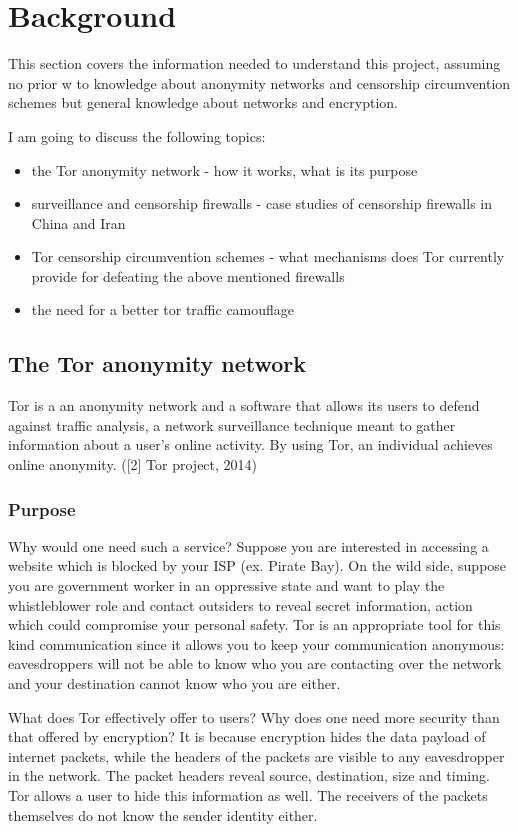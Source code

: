 \documentclass[11pt]{article} %
\begin{document}
\section{Background}

This section covers the information needed to understand this project, assuming no prior w to knowledge about anonymity networks and censorship circumvention schemes but general knowledge about networks and encryption.

I am going to discuss the following topics:

\begin{itemize}
\item the Tor anonymity network - how it works, what is its purpose
\item surveillance and censorship firewalls - case studies of censorship firewalls in China and Iran 
\item Tor censorship circumvention schemes - what mechanisms does Tor currently provide for defeating the above mentioned firewalls
\item the need for a better tor traffic camouflage
\end{itemize}

\subsection{The Tor anonymity network}
Tor is a an anonymity network and a software that allows its users to defend against traffic analysis, a network surveillance technique meant to gather information about a user’s online activity. By using Tor, an individual achieves online anonymity. ([2] Tor project, 2014)

\subsubsection{Purpose}
Why would one need such a service? Suppose you are interested in accessing a website which is blocked by your ISP (ex. Pirate Bay). On the wild side, suppose you are government worker in an oppressive state and want to play the whistleblower role and contact outsiders to reveal secret information, action which could compromise your personal safety. Tor is an appropriate tool for this kind communication since it allows you to keep your communication anonymous: eavesdroppers will not be able to know who you are contacting over the network and your destination cannot know who you are either.

What does Tor effectively offer to users? Why does one need more security than that offered by encryption? It is because encryption hides the data payload of internet packets, while the headers of the packets are visible to any eavesdropper in the network. The packet headers reveal source, destination, size and timing. Tor allows a user to hide this information as well. The receivers of the packets themselves do not know the sender identity either.
\end{document}
